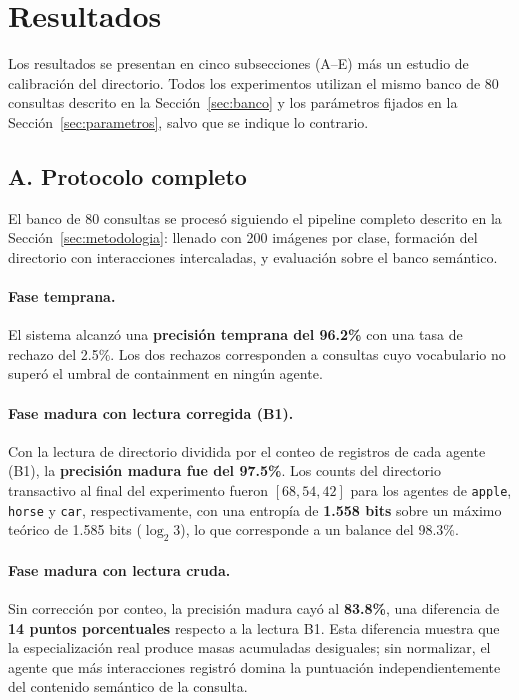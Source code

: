 \section{Resultados}
\label{sec:resultados}

Los resultados se presentan en cinco subsecciones (A--E) más un estudio de calibración del directorio.
Todos los experimentos utilizan el mismo banco de 80 consultas descrito en la Sección~\ref{sec:banco} y los parámetros fijados en la Sección~\ref{sec:parametros}, salvo que se indique lo contrario.

\subsection{A. Protocolo completo}
\label{sec:proto-completo}

El banco de 80 consultas se procesó siguiendo el pipeline completo descrito en la Sección~\ref{sec:metodologia}: llenado con 200 imágenes por clase, formación del directorio con interacciones intercaladas, y evaluación sobre el banco semántico.

\paragraph{Fase temprana.}
El sistema alcanzó una \textbf{precisión temprana del 96.2\%} con una tasa de rechazo del 2.5\%.
Los dos rechazos corresponden a consultas cuyo vocabulario no superó el umbral de containment en ningún agente.

\paragraph{Fase madura con lectura corregida (B1).}
Con la lectura de directorio dividida por el conteo de registros de cada agente (B1), la \textbf{precisión madura fue del 97.5\%}.
Los counts del directorio transactivo al final del experimento fueron $[68, 54, 42]$ para los agentes de \texttt{apple}, \texttt{horse} y \texttt{car}, respectivamente, con una entropía de \textbf{1.558 bits} sobre un máximo teórico de 1.585 bits ($\log_2 3$), lo que corresponde a un balance del 98.3\%.

\paragraph{Fase madura con lectura cruda.}
Sin corrección por conteo, la precisión madura cayó al \textbf{83.8\%}, una diferencia de \textbf{14 puntos porcentuales} respecto a la lectura B1.
Esta diferencia muestra que la especialización real produce masas acumuladas desiguales; sin normalizar, el agente que más interacciones registró domina la puntuación independientemente del contenido semántico de la consulta.

